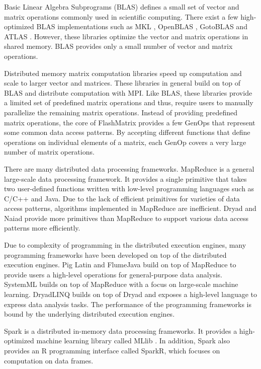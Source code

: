 Basic Linear Algebra Subprograms (BLAS) defines a small set of vector and
matrix operations commonly used in scientific computing. There exist a few
high-optimized BLAS implementations such as MKL \cite{mkl}, OpenBLAS
\cite{openblas}, GotoBLAS \cite{Goto} and ATLAS \cite{atlas}. However, these
libraries optimize the vector and matrix operations in shared memory. BLAS
provides only a small number of vector and matrix operations.

Distributed memory matrix computation libraries \cite{trilinos, petsc, elemental}
speed up computation and scale to larger vector and matrices. These libraries
in general build on top of BLAS and distribute computation with MPI. Like BLAS,
these libraries provide a limited set of predefined matrix operations and thus,
require users to manually parallelize the remaining matrix operations. Instead
of providing predefined matrix operations, the core of FlashMatrix provides
a few GenOps that represent some common data access patterns. By accepting
different functions that define operations on individual elements of a matrix,
each GenOp covers a very large number of matrix operations.

There are many distributed data processing frameworks.
MapReduce \cite{mapreduce} is a general large-scale data processing framework.
It provides a single primitive that takes two user-defined functions written with
low-level programming languages such as C/C++ and Java. Due to the lack of
efficient primitives for varieties of data access patterns, algorithms
implemented in MapReduce are inefficient. Dryad \cite{dryad} and
Naiad \cite{naiad} provide more primitives than MapReduce to support various
data access patterns more efficiently.

Due to complexity of programming in the distributed execution engines, many
programming frameworks have been developed on top of the distributed execution
engines. Pig Latin \cite{pig} and FlumeJava \cite{flumejava} build
on top of MapReduce to provide users a high-level operations for
general-purpose data analysis. SystemML \cite{systemml} builds
on top of MapReduce with a focus on large-scale machine learning.
DryadLINQ \cite{dryadlinq} builds on top of Dryad and exposes a high-level
language to express data analysis tasks. The performance of the programming
frameworks is bound by the underlying distributed execution engines.

Spark \cite{spark} is a distributed in-memory data processing frameworks.
It provides a high-optimized machine learning library called MLlib \cite{mllib}.
In addition, Spark also provides an R programming interface called SparkR, which
focuses on computation on data frames.

